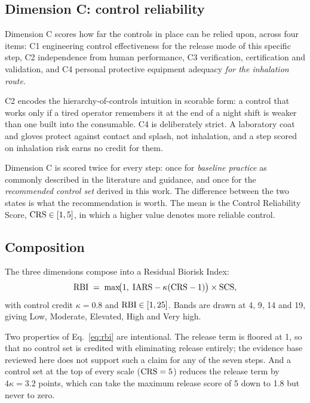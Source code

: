 \subsection{Dimension C: control reliability}

Dimension C scores how far the controls in place can be relied upon, across four items:
C1 engineering control effectiveness for the release mode of this specific step, C2
independence from human performance, C3 verification, certification and validation, and
C4 personal protective equipment adequacy \emph{for the inhalation route}.

C2 encodes the hierarchy-of-controls intuition in scorable form: a control that works only
if a tired operator remembers it at the end of a night shift is weaker than one built into
the consumable. C4 is deliberately strict. A laboratory coat and gloves protect against
contact and splash, not inhalation, and a step scored on inhalation risk earns no credit
for them.

Dimension C is scored twice for every step: once for \emph{baseline practice} as commonly
described in the literature and guidance, and once for the \emph{recommended control set}
derived in this work. The difference between the two states is what the recommendation is
worth. The mean is the Control Reliability Score, $\textrm{CRS} \in [1,5]$, in which a higher value
denotes more reliable control.

\subsection{Composition}

The three dimensions compose into a Residual Biorisk Index:
\begin{equation}
\textrm{RBI} \;=\; \max\!\bigl(1,\; \textrm{IARS} - \kappa(\textrm{CRS} - 1)\bigr)\times \textrm{SCS} ,
\label{eq:rbi}
\end{equation}
with control credit $\kappa = 0.8$ and $\textrm{RBI} \in [1,25]$. Bands are drawn at 4, 9, 14 and
19, giving Low, Moderate, Elevated, High and Very high.

Two properties of Eq.~\eqref{eq:rbi} are intentional. The release term is floored at 1, so
that no control set is credited with eliminating release entirely; the evidence base
reviewed here does not support such a claim for any of the seven steps. And a control set
at the top of every scale ($\textrm{CRS} = 5$) reduces the release term by $4\kappa = 3.2$ points,
which can take the maximum release score of 5 down to 1.8 but never to zero.

